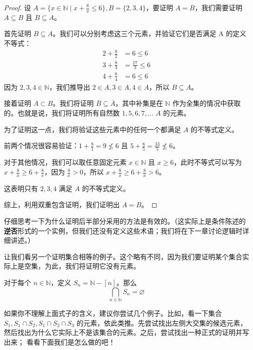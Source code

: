 \begin{proof}
    设 $A = \Big\{x \in \mathbb{N} \mid x + \frac{8}{x} \le 6\Big\}, B = \{2, 3, 4\}$，要证明 $A = B$，我们需要证明 $A \subseteq B$ 且 $B \subseteq A$。

    首先证明 $B \subseteq A$。我们可以分别考虑这三个元素，并验证它们是否满足 A 的定义不等式：
    \begin{align*}
        2 + \frac{8}{2} &= 6 \le 6 \\
        3 + \frac{8}{3} &= \frac{17}{3} \le 6 \\
        4 + \frac{8}{4} &= 6 \le 6
    \end{align*}
    因为 $2,3,4 \in \mathbb{N}$，我们推导出 $2 \in A, 3 \in A, 4 \in A$，所以 $B \subseteq A$。

    接着证明 $A \subset B$。我们将证明 $\overline{B} \subseteq \overline{A}$，其中补集是在 $\mathbb{N}$ 作为全集的情况中获取的。也就是说，我们将证明所有自然数 $1,5,6,7,\dots$  $A$ 的元素。

    为了证明这一点，我们将验证这些元素中的任何一个都满足 $A$ 的不等式定义。

    前两个情况很容易验证：$1 + \frac{8}{1} = 9 \nleq 6$ 且 $5 + \frac{8}{5} = \frac{33}{5} \nleq 6$。

    对于其他情况，我们可以取任意固定元素 $x \in \mathbb{N}$ 且 $x \ge 6$，此时不等式可以写为 $x + \frac{8}{x} \ge 6 + \frac{8}{x}$，因为 $\frac{8}{x} > 0$，所以 $x + \frac{8}{x} \ge 6 + \frac{8}{x} > 6$。

    这表明只有 $2,3,4$ 满足 $A$ 的不等式定义。

    综上，利用双重包含证明，我们证明出 $A = B$。
\end{proof}

仔细思考一下为什么证明后半部分采用的方法是有效的。（这实际上是条件陈述的\textbf{逆否}形式的一个实例，但我们还没有定义这些术语；我们将在下一章讨论逻辑时详细讲述。）

让我们看另一个证明集合相等的例子。这个略有不同，因为我们要证明某个集合实际上是空集，为此，我们将证明它没有元素。

\begin{proposition}
    对于每个 $n \in \mathbb{N}$，定义 $S_n = \mathbb{N}-[n]$。那么
    \[\bigcap_{n \in \mathbb{N}}S_n = \varnothing\]
\end{proposition}

如果你不理解上面式子的含义，建议你尝试几个例子。比如，看一下集合 $S_1, S_1 \cap S_2, S_1 \cap S_2 \cap S_3$ 的元素，依此类推。先尝试找出左侧大交集的候选元素，然后找出为什么它实际上不是该集合的元素。之后，尝试找出一种正式的证明并写出来； 看看下面我们是怎么做的吧！

